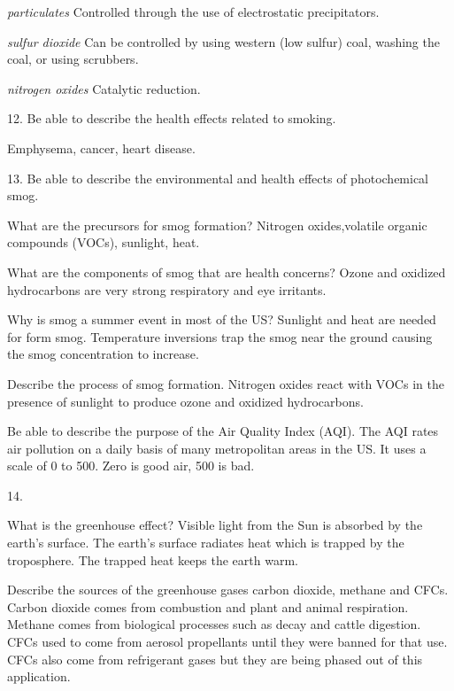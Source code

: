 \item{}
{\it particulates} Controlled through the use
of electrostatic precipitators.

\item{}
{\it sulfur dioxide}
Can be controlled by using western (low sulfur) coal,
washing the coal, or using scrubbers.

\item{}
{\it nitrogen oxides}
Catalytic reduction.

\bigskip
\item{12.}
Be able to describe the health effects related to smoking.

\item{} Emphysema, cancer, heart disease.

\vfill
\eject

\item{13.} Be able to describe the environmental and health
effects of photochemical smog.

\item{}
What are the precursors for smog formation?
Nitrogen oxides,volatile organic compounds (VOCs), sunlight, heat.

\item{}
What are the components of smog that are health concerns?
Ozone and oxidized hydrocarbons are very strong respiratory and eye irritants.

\item{}
Why is smog a summer event in most of the US?
Sunlight and heat are needed for form smog.
Temperature inversions trap the smog near the ground causing
the smog concentration to increase.

\item{}
Describe the process of smog formation.
Nitrogen oxides react with VOCs in the presence of sunlight
to produce ozone and oxidized hydrocarbons.

\item{}
Be able to describe the purpose of the Air Quality Index (AQI).
The AQI rates air pollution on a daily basis
of many metropolitan areas in the US.
It uses a scale of 0 to 500.
Zero is good air, 500 is bad.

\bigskip
\item{14.}

\bigskip
What is the greenhouse effect?
Visible light from the Sun is absorbed by the earth's surface.
The earth's surface radiates heat which is trapped by the troposphere.
The trapped heat keeps the earth warm.

\bigskip
Describe the sources of the greenhouse gases carbon dioxide, methane
and CFCs.
Carbon dioxide comes from combustion and plant and animal respiration.
Methane comes from biological processes such as decay and cattle digestion.
CFCs used to come from aerosol propellants until they were banned for that use.
CFCs also come from refrigerant gases but they are being phased
out of this application.

